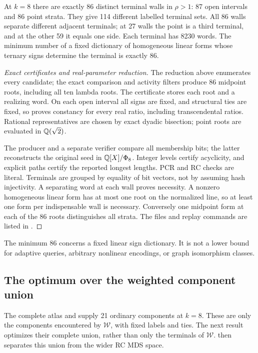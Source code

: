 \begin{theorem}\label{thm:complete-atlas}
At $k=8$ there are exactly 86 distinct terminal walls in $\rho>1$:
87 open intervals and 86 point strata. They give 114 different
labelled terminal sets. All 86 walls separate different adjacent
terminals; at 27 walls the point is a third terminal, and at the
other 59 it equals one side. Each terminal has 8230 words.
The minimum number of a fixed dictionary of homogeneous linear
forms whose ternary signs determine the terminal is exactly 86.
\end{theorem}
\begin{proof}[Exact certificates and real-parameter reduction]
The reduction above enumerates every candidate; the exact comparison
and activity filters produce 86 midpoint roots, including all ten
lambda roots. The certificate stores each root and a realizing
word. On each open interval all signs are fixed, and structural
ties are fixed, so  proves constancy for every real
ratio, including transcendental ratios. Rational representatives
are chosen by exact dyadic bisection; point roots are evaluated
in $\mathbb Q(\sqrt2)$.

The producer and a separate verifier compare all membership bits;
the latter reconstructs the original seed in $\mathbb Q[X]/\Phi_8$.
Integer levels certify acyclicity, and explicit paths certify the
reported longest lengths. PCR and RC checks are literal. Terminals
are grouped by equality of bit vectors, not by assuming hash
injectivity. A separating word at each wall proves necessity.
A nonzero homogeneous linear form has at most one root on the
normalized line, so at least one form per indispensable wall is
necessary. Conversely one midpoint form at each of the 86 roots
distinguishes all strata. The files and replay commands are listed
in .
\end{proof}
The minimum 86 concerns a fixed linear sign dictionary. It is not a
lower bound for adaptive queries, arbitrary nonlinear encodings,
or graph isomorphism classes.

\subsection{The optimum over the weighted component union}
\label{sec:weighted-component-union}
The complete atlas and  supply 21
ordinary components at $k=8$. These are only the components
encountered by $\mathcal W$, with fixed labels and ties.
The next result optimizes their complete union, rather than only the
terminals of $\mathcal W$.  then separates this union
from the wider RC MDS space.


